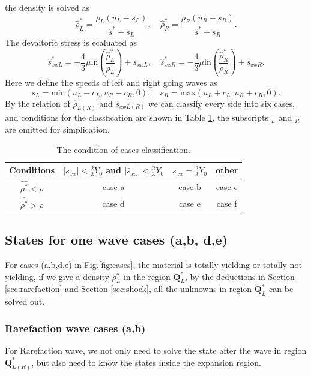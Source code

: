 \documentclass[review]{elsarticle}
\begin{document}
the density is solved as 
\begin{equation}
\hat{\rho}_L^* = \frac{\rho_L(u_L-s_L)}{\hat{s}^*-s_L}, \quad
\hat{\rho}_R^* = \frac{\rho_R(u_R-s_R)}{\hat{s}^*-s_R}.
\end{equation}
The devaitoric stress is ecaluated as 
\begin{equation}  \label{sxx1}
  \hat{s}_{xxL}^*=-\frac{4}{3}\mu\text{ln}(\frac{\hat{\rho}_L^*}{\rho_L})+s_{xxL}, \quad   \hat{s}_{xxR}^*=-\frac{4}{3}\mu\text{ln}(\frac{\hat{\rho}_R^*}{\rho_R})+s_{xxR}.
\end{equation}
Here we define the speeds of left and right going waves as
 \begin{equation}
      s_L = \text{min} (u_L-c_L, u_R-c_R, 0),  \quad s_R = \text{max}(u_L+c_L, u_R+c_R, 0).
\end{equation}
By  the relation of $\hat{\rho}_{L(R)}$ and  $\hat{s}_{xxL(R)}$ we can classify every side into six cases, and conditions for the classfication are  shown in Table \ref{tab:cases}, the  subscripts $_L$ and  $_R$  are omitted for simplication. 

\begin{table}
  \centering 
  \caption{The condition of  cases classification.}
  \begin{tabular}{c|ccc}
	\toprule
	Conditions & $|s_{xx}|<\frac{2}{3}Y_0$ and $|\hat{s}_{xx}|<\frac{2}{3}Y_0$ & $s_{xx}=\frac{2}{3}Y_0$&  other\\
  \midrule
  $\hat{\rho^*} <\rho$ & case a& case b& case c \\
  $\hat{\rho^*} >\rho$ & case d& case e& case f \\
  \bottomrule
\end{tabular}
\label{tab:cases}
\end{table}

\subsection{States for one wave cases (a,b, d,e)}\label{sec:one}
For cases (a,b,d,e) in Fig.\ref{fig:cases}, the material is totally yielding or totally not yielding, if we give a density $\rho_L^*$ in the region $\mathbf{Q}_L^*$, by the deductions in Section \ref{sec:rarefaction} and Section \ref{sec:shock}, all the unknowns in region $\mathbf{Q}_L^*$ can be solved out.

\subsubsection{Rarefaction  wave cases (a,b)}
For Rarefaction wave, we not only  need to solve the state after the wave in region $\mathbf{Q}_{L(R)}^*$, but also  need to know the states inside the expansion region. 
\end{document}
